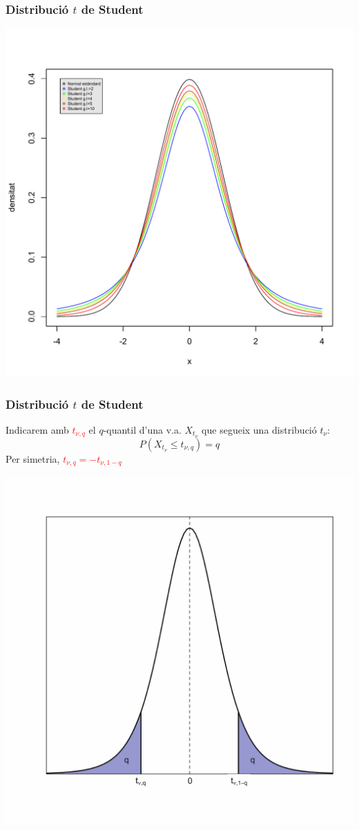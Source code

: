 \documentclass[12pt,t]{beamer}
\newcommand{\red}[1]{\textcolor{red}{#1}}
\renewcommand{\leq}{\leqslant}
\theoremstyle{plain}
\theoremstyle{definition}
\begin{document}
\begin{frame}
\frametitle{Distribució $t$ de Student}
\vspace*{-1cm}

\includegraphics[width=0.95\linewidth]{tstud-div.pdf}
\end{frame}


\begin{frame}
\frametitle{Distribució $t$ de Student}

Indicarem amb
\red{$t_{\nu,q}$} el  $q$-quantil d'una  v.a.  $X_{t_{\nu}}$ que segueix una distribució   $t_\nu$:
$$
P(X_{t_{\nu}}\leq t_{\nu,q})=q
$$
Per simetria,
\red{$t_{\nu,q}=-t_{\nu,1-q}$}
\vspace*{-1ex}

\begin{center}
\includegraphics[width=0.6\linewidth]{quantilt}
\end{center}
\end{frame}
\end{document}
